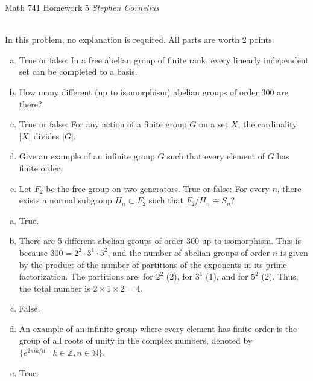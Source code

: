 \documentclass{article}
\begin{document}
\begin{center}
    Math 741
    \hfill Homework 5
    \hfill \textit{Stephen Cornelius}
\end{center}



\begin{problem} \\
    In this problem, no explanation is required. All parts are worth 2 points.
    \begin{enumerate}[(a)]
        \item True or false: In a free abelian group of finite rank, every linearly independent set can be completed to a basis.
        \item How many different (up to isomorphism) abelian groups of order $300$ are there?
        \item True or false: For any action of a finite group $G$ on a set $X$, the cardinality $|X|$ divides $|G|$.
        \item Give an example of an infinite group $G$ such that every element of $G$ has finite order.
        \item Let $F_2$ be the free group on two generators. True or false: For every $n$, there exists a normal subgroup $H_n \subset F_2$ such that $F_2/H_n \cong S_n$?
    \end{enumerate}
\end{problem}

\begin{enumerate}[(a)]
    \item True.
    \item There are 5 different abelian groups of order 300 up to isomorphism. This is because $300 = 2^2 \cdot 3^1 \cdot 5^2$, and the number of abelian groups of order $n$ is given by the product of the number of partitions of the exponents in its prime factorization. The partitions are: for $2^2$ (2), for $3^1$ (1), and for $5^2$ (2). Thus, the total number is $2 \times 1 \times 2 = 4$. %
    \item False.
    \item An example of an infinite group where every element has finite order is the group of all roots of unity in the complex numbers, denoted by $\{e^{2\pi i k/n} \mid k \in \mathbb{Z}, n \in \mathbb{N}\}$.
    \item True. %
\end{enumerate}
\end{document}
